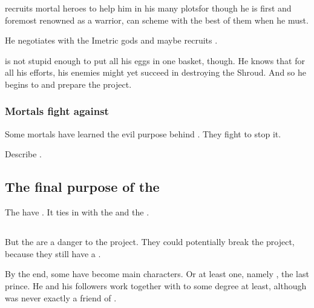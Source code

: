 \Ishnaruchaefir recruits mortal heroes to help him in his many plots\dash for though he is first and foremost renowned as a warrior, \Ishnaruchaefir can scheme with the best of them when he must. 

He negotiates with the Imetric gods and maybe recruits . 

\Ishnaruchaefir is not stupid enough to put all his eggs in one basket, though.
He knows that for all his efforts, his enemies might yet succeed in destroying the Shroud.
And so he begins to  and prepare the  project. 





\subsubsection{Mortals fight against \iquin}
Some mortals have learned the evil purpose behind \iquin. 
They fight to stop it. 

Describe . 









\subsection{The final purpose of the \Sephiroth}
The  have . 
It ties in with the  and the . 







\subsection{\Kezerad}
But the  are a danger to the \Sephirah{} project. They could potentially break the project, because they still have a .

By the end, some \Kezeradi{} have become main characters. Or at least one, namely , the last \Kezeradi{} prince. He and his followers work together with \Ishnaruchaefir{}\dash to some degree at least, although \Ishnaruchaefir{} was never exactly a friend of \Kezerad. 

